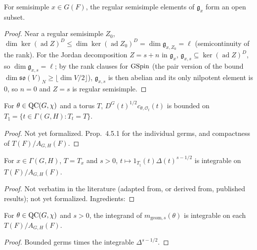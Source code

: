\begin{lemma}
\label{isOpen_regularSS_lieCentralizer}
\leanok
{}
For semisimple $x\in G(F)$, the regular semisimple elements of $\mathfrak g_x$ form an open subset.
\end{lemma}
\begin{proof}
\leanok
{}
Near a regular semisimple $Z_0$, $\dim\ker(\operatorname{ad}Z)^D\le\dim\ker(\operatorname{ad}Z_0)^D=\dim\mathfrak g_{x,Z_0}=\ell$ (semicontinuity of the rank). For the Jordan decomposition $Z=s+n$ in $\mathfrak g_x$, $\mathfrak g_{x,s}\subseteq\ker(\operatorname{ad}Z)^D$, so $\dim\mathfrak g_{x,s}=\ell$; by the rank clauses for $\mathrm{GSpin}$ (the pair version of the bound $\dim\mathfrak{so}(V)_N\ge\lfloor\dim V/2\rfloor$), $\mathfrak g_{x,s}$ is then abelian and its only nilpotent element is $0$, so $n=0$ and $Z=s$ is regular semisimple.
\end{proof}

\begin{lemma}
\label{germ_bound_of_mem_QC}
\leanok
{}
For $\theta\in\mathrm{QC}(G,\chi)$ and a torus $T$, $D^G(t)^{1/2}c_{\theta,\mathcal O_t}(t)$ is bounded on
$T_\natural=\{t\in\Gamma(G,H): T_t=T\}$.
\end{lemma}
\begin{proof}
Not yet formalized. \cite{BP} Prop.~4.5.1 for the individual germs, and compactness of $T(F)/A_{G,H}(F)$.
\end{proof}

\begin{theorem}
\label{bp_integrable_deltaGGP_rpow}
\leanok
{}
For $x\in\Gamma(G,H)$, $T=T_x$ and $s>0$, $t\mapsto 1_{T_\natural}(t)\Delta(t)^{s-1/2}$ is integrable on
$T(F)/A_{G,H}(F)$.
\end{theorem}
\begin{proof}
Not verbatim in the literature (adapted from, or derived from, published results); not yet formalized. Ingredients: 
\end{proof}

\begin{lemma}
\label{isTorusIntegrable_of_mem_QC}
\leanok
{}
For $\theta\in\mathrm{QC}(G,\chi)$ and $s>0$, the integrand of $m_{\mathrm{geom},s}(\theta)$ is integrable on each
$T(F)/A_{G,H}(F)$.
\end{lemma}
\begin{proof}
\leanok
{}
Bounded germs times the integrable $\Delta^{s-1/2}$.
\end{proof}

